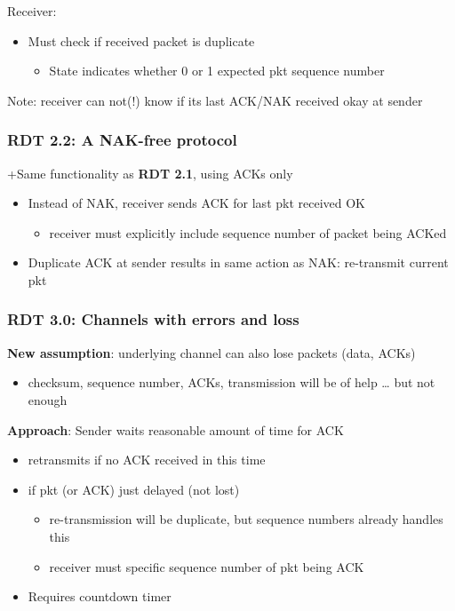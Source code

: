 \documentclass[11pt]{article}
\begin{document}
Receiver: 
\begin{itemize}
\item Must check if received packet is duplicate
\begin{itemize}
\item State indicates whether 0 or 1 expected pkt sequence number
\end{itemize}
\end{itemize}

Note: receiver can not(!) know if its last ACK/NAK received okay at
sender 

\subsubsection{RDT 2.2: A NAK-free protocol}
\label{sec:orgbb0225a}

+Same functionality as \textbf{RDT 2.1}, using ACKs only 
\begin{itemize}
\item Instead of NAK, receiver sends ACK for last pkt received OK
\begin{itemize}
\item receiver must explicitly include sequence number of packet being
ACKed
\end{itemize}
\item Duplicate ACK at sender results in same action as NAK: re-transmit
current pkt
\end{itemize}

\subsubsection{RDT 3.0: Channels with errors and loss}
\label{sec:orge09f5b9}

\textbf{New assumption}: underlying channel can also lose packets (data,
ACKs)
\begin{itemize}
\item checksum, sequence number, ACKs, transmission will be of help
\ldots{} but not enough
\end{itemize}

\textbf{Approach}: Sender waits reasonable amount of time for ACK
\begin{itemize}
\item retransmits if no ACK received in this time
\item if pkt (or ACK) just delayed (not lost)
\begin{itemize}
\item re-transmission will be duplicate, but sequence numbers already
handles this
\item receiver must specific sequence number of pkt being ACK
\end{itemize}
\item Requires countdown timer
\end{itemize}
\end{document}
